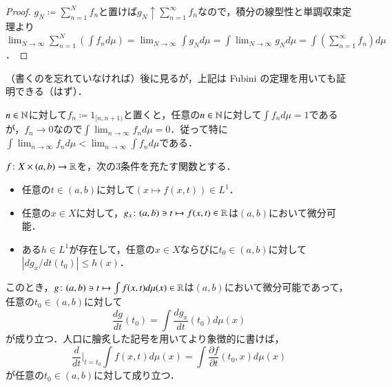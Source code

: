 \begin{proof}
$g_N \coloneqq  \sum_{n=1}^N f_n$と置けば$g_N \uparrow \sum_{n=1}^\infty f_n$なので，積分の線型性と単調収束定理より$\lim_{N\to\infty} \sum_{n=1}^N \left(\int f_n d \mu\right) = \lim_{N \to \infty} \int g_N d\mu = \int \lim_{N \to \infty} g_N d \mu = \int  \left(\sum_{n=1}^\infty f_n\right) d \mu$．
\end{proof}

\begin{dig}（書くのを忘れていなければ）後に見るが，上記は Fubini の定理を用いても証明できる（はず）．
\end{dig}

\begin{exm}
$n \in \mathbb{N}$に対して$f_n \coloneqq 1_{[n,n+1)}$と置くと，任意の$n \in \mathbb{N}$に対して$\int f_n d \mu = 1$であるが，$f_n \to 0$なので$\int \lim_{n\to\infty}f_n d\mu=0$．従って特に$\int \lim_{n\to\infty}f_n d\mu < \lim_{n\to\infty} \int f_n d\mu$である．
\end{exm}

\begin{thm}[微分と積分の交換]\label{微分と積分の交換}
$f \colon X \times (a,b) \to \mathbb{R}$を，次の3条件を充たす関数とする．
\begin{itemize}
\item 任意の$t \in (a,b)$に対して$(x \mapsto f(x,t)) \in L^1$．
\item 任意の$x \in X$に対して，$g_x \colon (a,b) \ni t \mapsto f(x,t) \in \mathbb{R}$は$(a,b)$において微分可能．
\item ある$h \in L^1$が存在して，任意の$x \in X$ならびに$t_0 \in (a,b)$に対して$\left| d g_x / dt (t_0) \right| \leq h(x)$．
\end{itemize}
このとき，$g \colon (a,b) \ni t \mapsto \int f(x,t) d\mu(x) \in \mathbb{R}$は$(a,b)$において微分可能であって，任意の$t_0 \in (a,b)$に対して
\begin{equation}
\frac{dg}{dt}(t_0) = \int \frac{d g_x}{dt}(t_0) d \mu(x)
\end{equation}が成り立つ．人口に膾炙した記号を用いてより象徴的に書けば，
\begin{equation}
\frac{d}{dt}\bigg|_{t=t_0} \int f(x,t) d\mu(x)  = \int \frac{\partial f}{\partial t} (t_0,x) d \mu(x)
\end{equation}が任意の$t_0 \in (a,b)$に対して成り立つ．
\end{thm}

